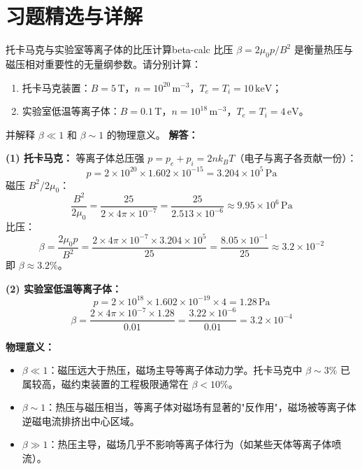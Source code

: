 ﻿%

\section*{习题精选与详解}

\begin{example}{托卡马克与实验室等离子体的比压计算}{beta-calc}
比压 $\beta = 2\mu_0 p / B^2$ 是衡量热压与磁压相对重要性的无量纲参数。请分别计算：
\begin{enumerate}[label=(\arabic*)]
\item 托卡马克装置：$B=5\,\mathrm{T}$，$n=10^{20}\,\mathrm{m}^{-3}$，$T_e=T_i=10\,\mathrm{keV}$；
\item 实验室低温等离子体：$B=0.1\,\mathrm{T}$，$n=10^{18}\,\mathrm{m}^{-3}$，$T_e=T_i=4\,\mathrm{eV}$。
\end{enumerate}
并解释 $\beta\ll 1$ 和 $\beta\sim 1$ 的物理意义。
\tcblower
\textbf{解答：}

\textbf{(1) 托卡马克：}
等离子体总压强 $p = p_e + p_i = 2nk_{\!B}T$（电子与离子各贡献一份）：
\[
p = 2\times 10^{20}\times 1.602\times 10^{-15} = 3.204\times 10^5\,\mathrm{Pa}
\]
磁压 $B^2/2\mu_0$：
\[
\frac{B^2}{2\mu_0} = \frac{25}{2\times 4\pi\times 10^{-7}} = \frac{25}{2.513\times 10^{-6}} \approx 9.95\times 10^6\,\mathrm{Pa}
\]
比压：
\[
\beta = \frac{2\mu_0 p}{B^2} = \frac{2\times 4\pi\times 10^{-7}\times 3.204\times 10^5}{25} = \frac{8.05\times 10^{-1}}{25} \approx 3.2\times 10^{-2}
\]
即 $\beta \approx 3.2\%$。

\textbf{(2) 实验室低温等离子体：}
\[
p = 2\times 10^{18}\times 1.602\times 10^{-19}\times 4 = 1.28\,\mathrm{Pa}
\]
\[
\beta = \frac{2\times 4\pi\times 10^{-7}\times 1.28}{0.01} = \frac{3.22\times 10^{-6}}{0.01} = 3.2\times 10^{-4}
\]

\textbf{物理意义：}
\begin{itemize}[leftmargin=*,itemsep=0pt]
\item $\beta\ll 1$：磁压远大于热压，磁场主导等离子体动力学。托卡马克中 $\beta\sim 3\%$ 已属较高，磁约束装置的工程极限通常在 $\beta<10\%$。
\item $\beta\sim 1$：热压与磁压相当，等离子体对磁场有显著的"反作用"，磁场被等离子体逆磁电流排挤出中心区域。
\item $\beta\gg 1$：热压主导，磁场几乎不影响等离子体行为（如某些天体等离子体喷流）。
\end{itemize}
\end{example}

